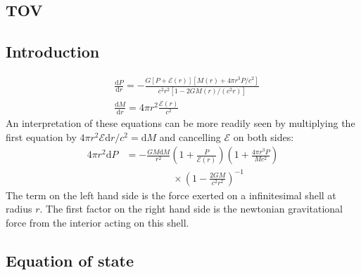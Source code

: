 \documentclass[twocolumn]{article}
\begin{document}
\begin{large}

\section*{TOV}
\subsection*{Introduction}
\begin{equation}
    \begin{split}
        &\frac{\text{d}P}{\text{d}r} = -\frac{G\left[P+\mathcal{E}(r)\right]\left[M(r)+4\pi r^3P/c^2\right]}{c^2r^2[1-2GM(r)/(c^2r)]} \\ 
        &\frac{\text{d}M}{\text{d}r} = 4\pi r^2\frac{\mathcal{E}(r)}{c^2}
    \end{split}
\end{equation}
An interpretation of these equations can be more readily seen by multiplying the first equation by $4\pi r^2\mathcal{E}\text{d}r/c^2 = \text{d}M$ and cancelling $\mathcal{E}$ on both sides:
\begin{equation}
    \label{28maj1039}
    \begin{split}
        4\pi r^2\text{d}P &= -\frac{GM\text{d}M}{r^2}\left(1+\frac{P}{\mathcal{E}(r)}\right)\left(1+\frac{4\pi r^3P}{Mc^2}\right) \\ 
        &\hspace{2cm}\times\left(1-\frac{2GM}{c^2r^2}\right)^{-1}
    \end{split}
\end{equation}
The term on the left hand side is the force exerted on a infinitesimal shell at radius $r$. The first factor on the right hand side is the newtonian gravitational force from the interior acting on this shell.

\subsection*{Equation of state}

\end{large}
\end{document}
